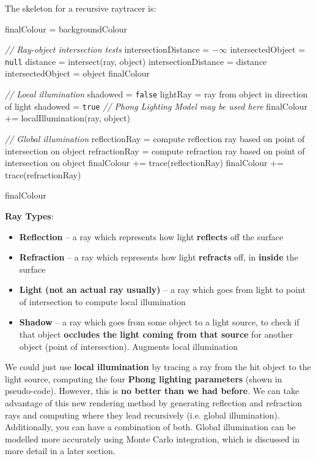 \documentclass{article}
\begin{document}
The skeleton for a recursive raytracer is:
\begin{algorithmic}[1]
	\STATE finalColour = backgroundColour
	
	\STATE \textit{// Ray-object intersection tests}
	\STATE intersectionDistance = $-\infty$
	\STATE intersectedObject = \texttt{null}
		\STATE distance = intersect(ray, object)
			\STATE intersectionDistance = distance
			\STATE intersectedObject = object
		\ENDIF
	\ENDFOR 
		\RETURN finalColour
	\ENDIF
	\STATE 
	
	\STATE \textit{// Local illumination}	
		\STATE shadowed = \texttt{false}
			\STATE lightRay = ray from object in direction of light
				\STATE shadowed = \texttt{true}
			\ENDIF
		\ENDFOR
			\STATE \textit{// Phong Lighting Model may be used here}
			\STATE finalColour += localIllumination(ray, object)
		\ENDIF
	\ENDFOR
	\STATE 	
	
	\STATE \textit{// Global illumination}
	\STATE reflectionRay = compute reflection ray based on point of intersection on object
	\STATE refractionRay = compute refraction ray based on point of intersection on object
	\STATE finalColour += trace(reflectionRay)
	\STATE finalColour += trace(refractionRay)
	\STATE 	
	
	\RETURN finalColour
\end{algorithmic}

\textbf{Ray Types}:
\begin{itemize}
	\item \textbf{Reflection} -- a ray which represents how light \textbf{reflects} off the surface
	\item \textbf{Refraction} -- a ray which represents how light \textbf{refracts} off, in \textbf{inside} the surface
	\item \textbf{Light (not an actual ray usually)} -- a ray which goes from light to point of intersection to compute local illumination
	\item \textbf{Shadow} -- a ray which goes from some object to a light source, to check if that object \textbf{occludes the light coming from that source} for another object (point of intersection). Augments local illumination
\end{itemize}

We could just use \textbf{local illumination} by tracing a ray from the hit object to the light source, computing the four \textbf{Phong lighting parameters} (shown in pseudo-code). However, this is \textbf{no better than we had before}. We can take advantage of this new rendering method by generating reflection and refraction rays and computing where they lead recursively (i.e. global illumination). Additionally, you can have a combination of both. Global illumination can be modelled more accurately using Monte Carlo integration, which is discussed in more detail in a later section.
\end{document}
